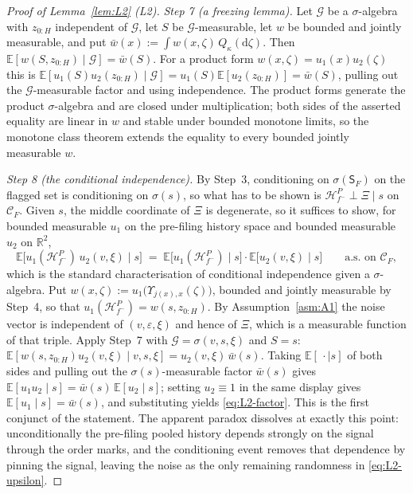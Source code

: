 \documentclass[11pt]{article}
\newcommand{\Eop}{\mathbb{E}}
\newcommand{\Sfl}{\mathsf{S}_F}
\begin{document}
\begin{proof}[Proof of Lemma~\ref{lem:L2} (L2)]
\emph{Step 7 (a freezing lemma).} Let $\mathcal G$ be a $\sigma$-algebra with $z_{0:H}$ independent
of $\mathcal G$, let $S$ be $\mathcal G$-measurable, let $w$ be bounded and jointly measurable, and
put $\bar w(x) := \int w(x,\zeta)\,Q_\kappa(\mathrm d\zeta)$. Then
$\Eop[w(S,z_{0:H}) \mid \mathcal G] = \bar w(S)$. For a product form $w(x,\zeta) = u_1(x)u_2(\zeta)$
this is
$\Eop[u_1(S)u_2(z_{0:H}) \mid \mathcal G] = u_1(S)\Eop[u_2(z_{0:H})] = \bar w(S)$, pulling out the
$\mathcal G$-measurable factor and using independence. The product forms generate the product
$\sigma$-algebra and are closed under multiplication; both sides of the asserted equality are linear
in $w$ and stable under bounded monotone limits, so the monotone class theorem extends the equality
to every bounded jointly measurable $w$.

\emph{Step 8 (the conditional independence).} By Step~3, conditioning on $\sigma(\Sfl)$ on the
flagged set is conditioning on $\sigma(s)$, so what has to be shown is
$\mathcal H_{f^-}^P \perp \Xi \mid s$ on $\mathcal C_F$. Given $s$, the middle coordinate of $\Xi$ is
degenerate, so it suffices to show, for bounded measurable $u_1$ on the pre-filing history space and
bounded measurable $u_2$ on $\mathbb R^2$,
\begin{equation}
\label{eq:L2-factor}
\Eop\bigl[u_1(\mathcal H_{f^-}^P)\,u_2(v,\xi) \mid s\bigr]
 \;=\; \Eop\bigl[u_1(\mathcal H_{f^-}^P) \mid s\bigr]\cdot\Eop\bigl[u_2(v,\xi) \mid s\bigr]
 \qquad \text{a.s.\ on } \mathcal C_F,
\end{equation}
which is the standard characterisation of conditional independence given a $\sigma$-algebra. Put
$w(x,\zeta) := u_1\bigl(\Upsilon_{j(x),x}(\zeta)\bigr)$, bounded and jointly measurable by Step~4, so
that $u_1(\mathcal H_{f^-}^P) = w(s,z_{0:H})$. By Assumption~\ref{asm:A1} the noise vector is
independent of $(v,\varepsilon,\xi)$ and hence of $\Xi$, which is a measurable function of that
triple. Apply Step~7 with $\mathcal G = \sigma(v,s,\xi)$ and $S = s$:
$\Eop[w(s,z_{0:H})u_2(v,\xi) \mid v,s,\xi] = u_2(v,\xi)\,\bar w(s)$. Taking
$\Eop[\,\cdot \mid s]$ of both sides and pulling out the $\sigma(s)$-measurable factor $\bar w(s)$
gives $\Eop[u_1u_2 \mid s] = \bar w(s)\,\Eop[u_2 \mid s]$; setting $u_2 \equiv 1$ in the same display
gives $\Eop[u_1 \mid s] = \bar w(s)$, and substituting yields \eqref{eq:L2-factor}. This is the first
conjunct of the statement. The apparent paradox dissolves at exactly this point: unconditionally the
pre-filing pooled history depends strongly on the signal through the order marks, and the
conditioning event removes that dependence by pinning the signal, leaving the noise as the only
remaining randomness in \eqref{eq:L2-upsilon}.


\end{proof}
\end{document}
